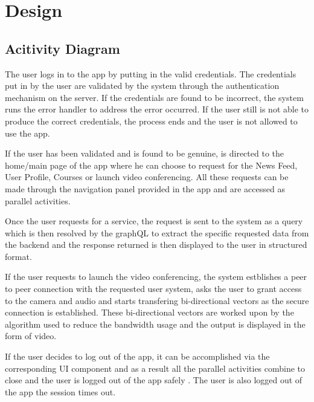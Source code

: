 \chapter{Design}


\section{Acitivity Diagram}

The user logs in to the app by putting in the valid credentials.
The credentials put in by the user are validated by the system through the authentication mechanism on the server.
If the credentials are found to be incorrect, the system runs the error handler to address the error occurred.
If the user still is not able to produce the correct credentials, the process ends and the user is not allowed to use the app.

If the user has been validated and is found to be genuine, is directed to the home/main page of the app where he can choose to request for the News Feed, User Profile, Courses or launch video conferencing.
All these requests can be made through the navigation panel provided in the app and are accessed as parallel activities.

Once the user requests for a service, the request is sent to the system as a query which is then resolved by the graphQL to extract the specific requested data from the backend and the response returned is then displayed to the user in structured format.

If the user requests to launch the video conferencing, the system estblishes a peer to peer connection with the requested user system, asks the user to grant access to the camera and audio and starts transfering bi-directional vectors as the secure connection is established.
These bi-directional vectors are worked upon by the algorithm used to reduce the bandwidth usage and the output is displayed in the form of video.

If the user decides to log out of the app, it can be accomplished via the corresponding UI component and as a result all the parallel activities combine to close and the user is logged out of the app safely .
The user is also logged out of the app the session times out.

